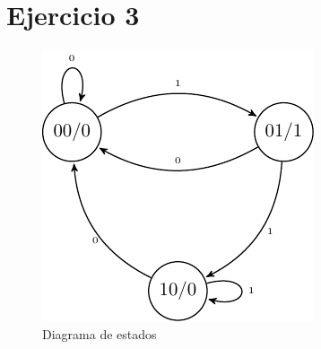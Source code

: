 \section{Ejercicio 3}

\begin{table}[H]
	\begin{center}
	\caption{Estados utilizados}
	\end{center}
	\label{Estados_Ej3}
\end{table}

\begin{table}[H]
\begin{center}
\end{center}
\end{table}

 \begin{figure}[H]
\begin{center}
\includegraphics[scale=0.75]{Ejercicio3/Diagramas/TransicionesEj3}
\caption{Diagrama de estados}
\end{center}
\label{Diagrama_de_estados}
\end{figure}

